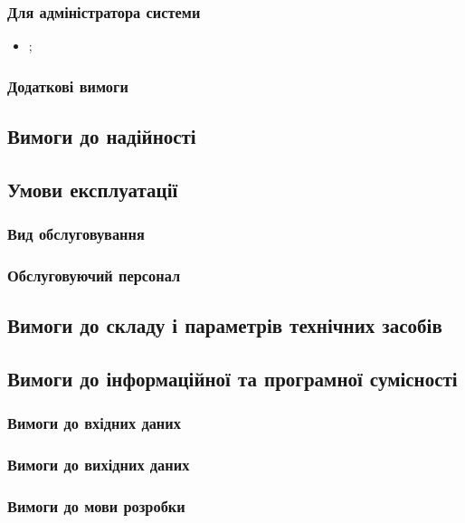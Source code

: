 \documentclass{kpi-thesis}
\begin{document}
\subsubsection{Для адміністратора системи}
\begin{itemize}
\item {};
\end{itemize}

\subsubsection{Додаткові вимоги}

\subsection{Вимоги до надійності}

\subsection{Умови експлуатації}
\subsubsection{Вид обслуговування}
\subsubsection{Обслуговуючий персонал}

\subsection{Вимоги до складу і параметрів технічних засобів}

\subsection{Вимоги до інформаційної та програмної сумісності}
\subsubsection{Вимоги до вхідних даних}
\subsubsection{Вимоги до вихідних даних}
\subsubsection{Вимоги до мови розробки}
\end{document}
